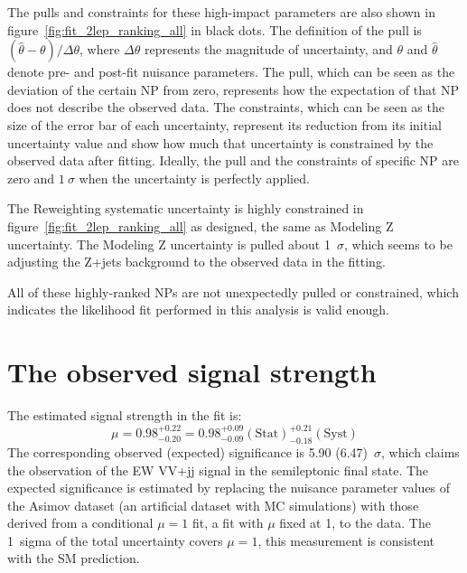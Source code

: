 The pulls and constraints for these high-impact parameters are also shown in figure~\ref{fig:fit_2lep_ranking_all} in black dots.
The definition of the pull is $(\hat{\theta}-\theta) / \Delta \theta$, where $\Delta \theta$ represents the magnitude of uncertainty, and $\theta$ and $\hat{\theta}$ denote pre- and post-fit nuisance parameters.
The pull, which can be seen as the deviation of the certain NP from zero, represents how the expectation of that NP does not describe the observed data.
The constraints, which can be seen as the size of the error bar of each uncertainty, represent its reduction from its initial uncertainty value and show how much that uncertainty is constrained by the observed data after fitting.
Ideally, the pull and the constraints of specific NP are zero and $1~\sigma$ when the uncertainty is perfectly applied.

The Reweighting systematic uncertainty is highly constrained in figure~\ref{fig:fit_2lep_ranking_all} as designed, the same as Modeling Z uncertainty. The Modeling Z uncertainty is pulled about 1~$\sigma$, which seems to be adjusting the Z+jets background to the observed data in the fitting.

All of these highly-ranked NPs are not unexpectedly pulled or constrained, which indicates the likelihood fit performed in this analysis is valid enough.


\section{The observed signal strength}
\label{sec:mu}
The estimated signal strength in the fit is:
\begin{equation}
    \mu = 0.98^{+ 0.22}_{- 0.20} = 0.98^{+ 0.09}_{- 0.09}(\mathrm{Stat})^{+ 0.21}_{- 0.18}(\mathrm{Syst}) 
\end{equation}
The corresponding observed (expected) significance is 5.90 (6.47)~$\sigma$, which claims the observation of the EW VV+jj signal in the semileptonic final state. 
The expected significance is estimated by replacing the nuisance parameter values of the Asimov dataset (an artificial dataset with MC simulations) with those derived from a conditional $\mu = 1$ fit, a fit with $\mu$ fixed at 1, to the data. 
The 1~sigma of the total uncertainty covers $\mu = 1$, this measurement is consistent with the SM prediction.

